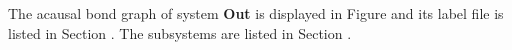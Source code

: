 

   The acausal bond graph of system \textbf{Out} is
   displayed in Figure  and its label
   file is listed in Section .
   The subsystems are listed in Section .
